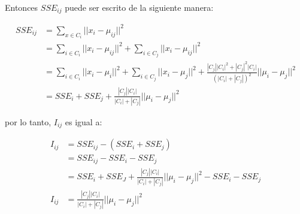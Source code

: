 Entonces $SSE_{ij}$ puede ser escrito de la siguiente manera:

\begin{align*}
    SSE_{ij} & = \sum_{x\in C_i} ||x_i - \mu_{ij}||^2                                                                                                    \\
             & = \sum_{i \in C_i} ||x_i-\mu_{ij}||^2  +\sum_{i \in C_j} ||x_i-\mu_{ij}||^2                                                               \\
             & = \sum_{i \in C_i} ||x_i-\mu_i||^2 +\sum_{i \in C_j} ||x_i-\mu_j||^2+ \frac{|C_j||C_i|^2+|C_j|^2|C_i|}{(|C_i|+|C_j|)^2} ||\mu_i-\mu_j||^2 \\
             & = SSE_i + SSE_j + \frac{|C_j||C_i|}{|C_i|+|C_j|} ||\mu_i-\mu_j||^2
\end{align*}

por lo tanto, $I_{ij}$ es igual a:

\begin{align*}
    I_{ij} & =  SSE_{ij} - (SSE_{i}+SSE_{j})                                             \\
           & =  SSE_{ij} - SSE_{i}-SSE_{j}                                               \\
           & = SSE_i+SSE_J +\frac{|C_j||C_i|}{|C_i|+|C_j|} ||\mu_i-\mu_j||^2-SSE_i-SSE_j \\
    I_{ij} & =  \frac{|C_j||C_i|}{|C_i|+|C_j|} ||\mu_i-\mu_j||^2
\end{align*}